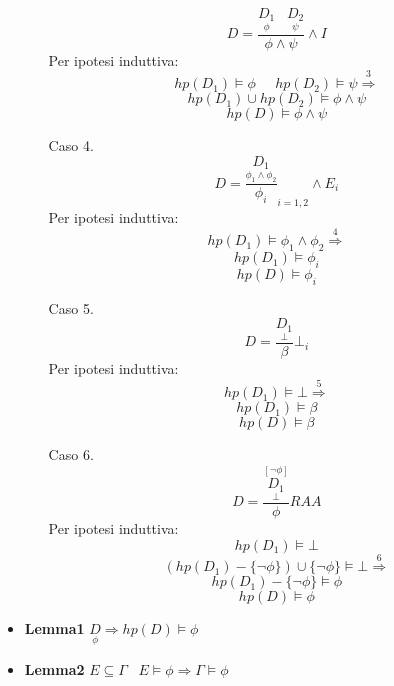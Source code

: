 \documentclass{article}
\theoremstyle{break}
\theoremstyle{break}
\theoremstyle{break}
\theoremstyle{break}
\begin{document}
\begin{enumerate}
\begin{enumerate}
                \[
                  D=\frac{\underset{\phi}{D_1}\;\;\;\underset{\psi}{D_2}}{\phi \wedge \psi} \wedge I
                \] 
                Per ipotesi induttiva:
                \[
                hp(D_1) \models \phi\;\;\;\;\; hp(D_2) \models \psi \stackrel{3}{\Rightarrow}
                \] 
                \[
                hp(D_1) \cup hp(D_2) \models \phi \wedge \psi
                \] 
                \[
                hp(D) \models \phi \wedge \psi
                \] 
              \item [Caso 4.] 
                \[
                  D=\frac{\underset{\phi_1 \wedge \phi_2}{D_1}}{\phi_i}_{i=1,2} \wedge E_i
                \] 
                Per ipotesi induttiva:
                \[
                hp(D_1) \models \phi_1 \wedge \phi_2 \stackrel{4}{\Rightarrow}
                \]  
                \[
                hp(D_1) \models \phi_i
                \] 
                \[
                hp(D) \models \phi_i
                \] 
              \item [Caso 5.]
                \[
                  D=\frac{\underset{\bot}{D_1}}{\beta}\bot_i
                \] 
                Per ipotesi induttiva:
                \[
                  hp(D_1) \models \bot \stackrel{5}{\Rightarrow}
                \] 
                \[
                hp(D_1) \models \beta
                \] 
                \[
                  hp(D) \models \beta
                \] 
              \item [Caso 6.]
                \[
                  D= \frac{\underset{\bot}{\stackrel{[\neg \phi]}{D_1}}}{\phi} RAA
                \] 
                Per ipotesi induttiva:
                \[
                hp(D_1) \models \bot
                \] 
                \[
                  (hp(D_1)-\{\neg \phi\}) \cup \{\neg \phi\} \models \bot \stackrel{6}{\Rightarrow}
                \] 
                \[
                hp(D_1) - \{\neg \phi\} \models \phi 
                \] 
                \[
                hp(D) \models \phi
                \] 
        \end{enumerate}
\end{enumerate}

\begin{itemize}
  \item \textbf{Lemma1} \( \underset{\phi}{D} \Rightarrow hp(D) \models \phi \)
  \item \textbf{Lemma2} \( E \subseteq \Gamma\;\;\; E \models \phi \Rightarrow \Gamma \models \phi \)
\end{itemize}
\end{document}
